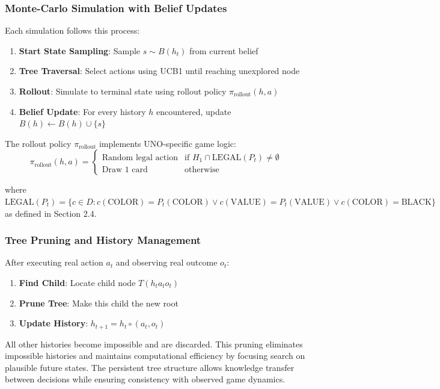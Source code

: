 \documentclass[journal,transmag]{IEEEtran}
\begin{document}
\subsubsection{Monte-Carlo Simulation with Belief Updates}

Each simulation follows this process:
\begin{enumerate}
    \item \textbf{Start State Sampling}: Sample $s \sim B(h_t)$ from current belief
    \item \textbf{Tree Traversal}: Select actions using UCB1 until reaching unexplored node
    \item \textbf{Rollout}: Simulate to terminal state using rollout policy $\pi_{\text{rollout}}(h,a)$
    \item \textbf{Belief Update}: For every history $h$ encountered, update $B(h) \leftarrow B(h) \cup \{s\}$
\end{enumerate}

The rollout policy $\pi_{\text{rollout}}$ implements UNO-specific game logic:
$$
\pi_{\text{rollout}}(h,a) = \begin{cases}
\text{Random legal action} & \text{if } H_1 \cap \text{LEGAL}(P_t) \neq \emptyset \\
\text{Draw 1 card} & \text{otherwise}
\end{cases}
$$

where $\text{LEGAL}(P_t) = \{c \in D : c(\text{COLOR}) = P_t(\text{COLOR}) \lor c(\text{VALUE}) = P_t(\text{VALUE}) \lor c(\text{COLOR}) = \text{BLACK}\}$ as defined in Section 2.4.

\subsubsection{Tree Pruning and History Management}

After executing real action $a_t$ and observing real outcome $o_t$:
\begin{enumerate}
    \item \textbf{Find Child}: Locate child node $T(h_t a_t o_t)$
    \item \textbf{Prune Tree}: Make this child the new root
    \item \textbf{Update History}: $h_{t+1} = h_t \circ (a_t, o_t)$
\end{enumerate}

All other histories become impossible and are discarded. This pruning eliminates impossible histories and maintains computational efficiency by focusing search on plausible future states. The persistent tree structure allows knowledge transfer between decisions while ensuring consistency with observed game dynamics.
\end{document}
